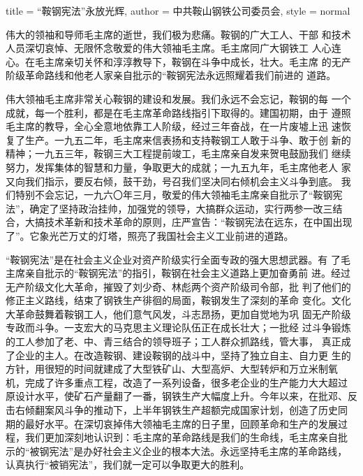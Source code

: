 \begin{hongqiarticle}{
        title  = {“鞍钢宪法”永放光辉},
        author = {中共鞍山钢铁公司委员会},
        style  = normal
    }

    伟大的领袖和导师毛主席的逝世，我们极为悲痛。鞍钢的广大工人、干部
    和技术人员深切哀悼、无限怀念敬爱的伟大领袖毛主席。毛主席同广大钢铁工
    人心连心。在毛主席亲切关怀和淳淳教导下，鞍钢在斗争中成长，壮大。毛主席
    的无产阶级革命路线和他老人家亲自批示的“鞍钢宪法永远照耀着我们前进的
    道路。

    伟大领袖毛主席非常关心鞍钢的建设和发展。我们永远不会忘记，鞍钢的每
    一个成就，每一个胜利，都是在毛主席革命路线指引下取得的。建国初期，由于
    遵照毛主席的教导，全心全意地依靠工人阶级，经过三年奋战，在一片废墟上迅
    速恢复了生产。一九五二年，毛主席来信表扬和支持鞍钢工人敢于斗争、敢于创
    新的精神；一九五三年，鞍钢三大工程提前竣工，毛主席亲自发来贺电鼓励我们
    继续努力，发挥集体的智慧和力量，争取更大的成就；一九五九年，毛主席他老人
    家又向我们指示，要反右倾，鼓干劲，号召我们坚决同右倾机会主义斗争到底。
    我们特别不会忘记，一九六〇年三月，敬爱的伟大领袖毛主席亲自批示了“鞍钢宪
    法”，确定了坚持政治挂帅，加强党的领导，大搞群众运动，实行两参一改三结
    合，大搞技术革新和技术革命的原则，庄严宣告：“鞍钢宪法在远东，在中国出现
    了”。它象光芒万丈的灯塔，照亮了我国社会主义工业前进的道路。

    “鞍钢宪法”是在社会主义企业对资产阶级实行全面专政的强大思想武器。有
    了毛主席亲自批示的“鞍钢宪法”的指引，鞍钢在社会主义道路上更加奋勇前
    进。经过无产阶级文化大革命，摧毁了刘少奇、林彪两个资产阶级司令部，批
    判了他们的修正主义路线，结束了钢铁生产徘徊的局面，鞍钢发生了深刻的革命
    变化。文化大革命鼓舞着鞍钢工人，他们意气风发，斗志昂扬，更加自觉地为巩
    固无产阶级专政而斗争。一支宏大的马克思主义理论队伍正在成长壮大；一批经
    过斗争锻炼的工人参加了老、中、青三结合的领导班子；工人群众抓路线，管大事，
    真正成了企业的主人。在改造鞍钢、建设鞍钢的战斗中，坚持了独立自主、自力更
    生的方针，用很短的时间就建成了大型铁矿山、大型高炉、大型转炉和万立米制氧
    机，完成了许多重点工程，改造了一系列设备，很多老企业的生产能力大大超过
    原设计水平，使矿石产量翻了一番，钢铁生产大幅度上升。今年以来，在批邓、反
    击右倾翻案风斗争的推动下，上半年钢铁生产超额完成国家计划，创造了历史同
    期的最好水平。在深切哀掉伟大领袖毛主席的日子里，回顾革命和生产的发展过
    程，我们更加深刻地认识到：毛主席的革命路线是我们的生命线，毛主席亲自批
    示的“被钢宪法”是办好社会主义企业的根本大法。永远坚持毛主席的革命路线，
    认真执行“被销宪法”，我们就一定可以争取更大的胜利。


\end{hongqiarticle}
